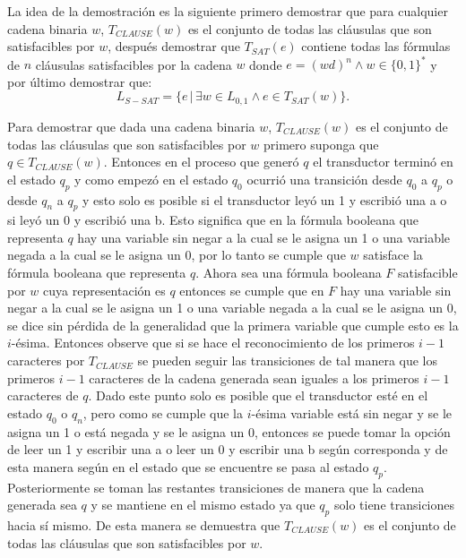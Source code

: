 \documentclass[12pt]{article}
\begin{document}
La idea de la demostración es la siguiente primero demostrar que para cualquier cadena binaria $w$, $T_{CLAUSE}(w)$ es
el conjunto de todas las cláusulas que son satisfacibles por $w$, después demostrar que $T_{SAT}(e)$ contiene todas
las fórmulas de $n$ cláusulas satisfacibles  por la cadena $w$ donde $e=(wd)^n \wedge w\in\{0,1\}^*$ y por último demostrar que:
$$L_{S-SAT} = \{e\,|\,\exists w \in L_{0,1} \wedge e \in T_{SAT}(w) \}.$$

Para demostrar que dada una cadena binaria $w$, $T_{CLAUSE}(w)$ es el conjunto de todas las cláusulas que son satisfacibles 
por $w$ primero suponga que $q\in T_{CLAUSE}(w)$. Entonces en el proceso que generó $q$ el transductor terminó en el estado 
$q_p$ y como empezó en el estado $q_0$ ocurrió una transición desde $q_0$ a $q_p$ o desde $q_n$ a $q_p$ y esto solo es posible
si el transductor leyó un 1 y escribió una a o si leyó un 0 y escribió una b. Esto significa que en la fórmula booleana
que representa $q$ hay una variable sin negar a la cual se le asigna un 1 o una variable negada a la cual se le asigna un 0,
por lo tanto se cumple que $w$ satisface la fórmula booleana que representa $q$. Ahora sea una fórmula booleana $F$ satisfacible 
por $w$ cuya representación es $q$ entonces se cumple que en $F$ hay una variable sin negar a la cual se le asigna un 1 o una variable 
negada a la cual se le asigna un 0, se dice sin pérdida de la generalidad que la primera variable que cumple esto es la $i$-ésima.
Entonces observe que si se hace el reconocimiento de los primeros $i-1$ caracteres por $T_{CLAUSE}$ se pueden seguir 
las transiciones de tal manera que los primeros $i-1$ caracteres de la cadena generada sean iguales a los primeros $i-1$
caracteres de $q$. Dado este punto solo es posible que el transductor esté en el estado $q_0$ o $q_n$, pero como se cumple
que la $i$-ésima variable está sin negar y se le asigna un 1 o está negada y se le asigna un 0, entonces se puede tomar 
la opción de leer un 1 y escribir una a o leer un 0 y escribir una b según corresponda y de esta manera según en el estado que se
encuentre se pasa al estado $q_p$. Posteriormente se toman las restantes transiciones de manera que la cadena generada
sea $q$ y se mantiene en el mismo estado ya que $q_p$ solo tiene transiciones hacia sí mismo. De esta manera se demuestra
que $T_{CLAUSE}(w)$ es el conjunto de todas las cláusulas que son satisfacibles por $w$.
\end{document}
